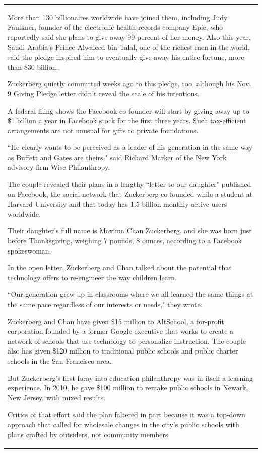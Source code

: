 \begin{table}
\begin{center}
\begin{tabular}{|L{14.7cm}|}
More than 130 billionaires worldwide have joined them, including Judy Faulkner, founder of the electronic health-records company Epic, who reportedly said she plans to give away 99 percent of her money. Also this year, Saudi Arabia's Prince Alwaleed bin Talal, one of the richest men in the world, said the pledge inspired him to eventually give away his entire fortune, more than \$30 billion.

Zuckerberg quietly committed weeks ago to this pledge, too, although his Nov. 9 Giving Pledge letter didn't reveal the scale of his intentions.

A federal filing shows the Facebook co-founder will start by giving away up to \$1 billion a year in Facebook stock for the first three years. Such tax-efficient arrangements are not unusual for gifts to private foundations.

``He clearly wants to be perceived as a leader of his generation in the same way as Buffett and Gates are theirs," said Richard Marker of the New York advisory firm Wise Philanthropy.

The couple revealed their plans in a lengthy ``letter to our daughter" published on Facebook, the social network that Zuckerberg co-founded while a student at Harvard University and that today has 1.5 billion monthly active users worldwide.

Their daughter's full name is Maxima Chan Zuckerberg, and she was born just before Thanksgiving, weighing 7 pounds, 8 ounces, according to a Facebook spokeswoman.

In the open letter, Zuckerberg and Chan talked about the potential that technology offers to re-engineer the way children learn.

``Our generation grew up in classrooms where we all learned the same things at the same pace regardless of our interests or needs," they wrote.

Zuckerberg and Chan have given \$15 million to AltSchool, a for-profit corporation founded by a former Google executive that works to create a network of schools that use technology to personalize instruction. The couple also has given \$120 million to traditional public schools and public charter schools in the San Francisco area.

But Zuckerberg's first foray into education philanthropy was in itself a learning experience. In 2010, he gave \$100 million to remake public schools in Newark, New Jersey, with mixed results.

Critics of that effort said the plan faltered in part because it was a top-down approach that called for wholesale changes in the city's public schools with plans crafted by outsiders, not community members.


\end{tabular}
\end{center}
\end{table}
